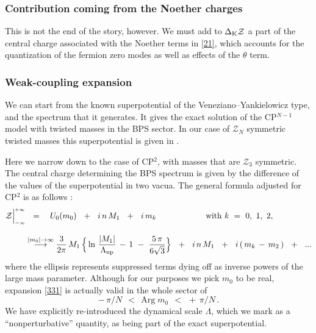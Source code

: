 \documentclass[epsfig,12pt]{article}
\def\beq{\begin{equation}}
\def\eeq{\end{equation}}
\def\beq{\begin{equation}}
\def\eeq{\end{equation}}
\newcommand{\mc}[1]{\mathcal{#1}}
\begin{document}
\subsubsection{Contribution coming from the Noether charges}

	This is not the end of the story, however. We must add to $\Delta_{\rm K}{\mathcal Z}$
	a part of the central charge associated with the Noether terms in \eqref{21}, which accounts for the quantization of the
	fermion zero modes as well as effects of the $\theta$ term.




\subsubsection{Weak-coupling expansion}

	We can start from the known superpotential of the Veneziano--Yankielowicz type, and the spectrum that it generates.
	It gives the  exact solution of the CP$^{N-1}$ model with twisted masses in the BPS sector. 
	In our case of $\mc{Z}_N$ symmetric twisted masses this superpotential is given in \cite{Bolokhov:2011mp}.
	
	Here we narrow down to the case of CP$^2$, with masses that are $ \mc{Z}_3 $ symmetric.
	The central charge determining the BPS spectrum is given by the difference of the values of the superpotential in  two vacua.
	The general formula adjusted for CP$^2$ is as follows \cite{Bolokhov:2011mp}:
\begin{align}
%
\label{331}
       \mc{Z}\Big|^{\scriptscriptstyle +\infty}_{\scriptscriptstyle -\infty} 
       & 
	~~=~~~ 
       U_0(m_0)  ~~+~~ i\, n\, M_1 ~~+~~ i\, m_k
	\qquad\qquad\qquad \text{with}~ k ~=~ 0,~1,~ 2,
	\\[3mm]
%
\notag
       &
	\stackrel{|m_0|\to\infty}{\longrightarrow} 
       \frac{3}{2\pi}\, M_1\, \Big\{ \ln\, \frac {   |M_1|   }
                                                 {  \Lambda_\text{np}  } \,-\, 1 
						 ~-~ \frac{5\, \pi}{6\sqrt{3}}
						\Big\}  ~~+~~  i\, n\, M_1
       ~~+~~ i\, (\, m_k \,-\, m_2 \,) ~~+~~ ...
\end{align}
	where the ellipsis represents  suppressed terms dying off as inverse powers of the large mass parameter.
	Although for our purposes we pick $ m_0 $ to be real, expansion \eqref{331} is actually valid in 
	the whole sector of 
\beq
	 -\,\pi / N ~~<~~ \text{Arg}\;m_0 ~~<~~ +\,\pi / N \,.
\eeq
	We have explicitly re-introduced the dynamical scale $ \Lambda $, which we mark as a 
	``nonperturbative'' quantity, as being part of the exact superpotential.
\end{document}

